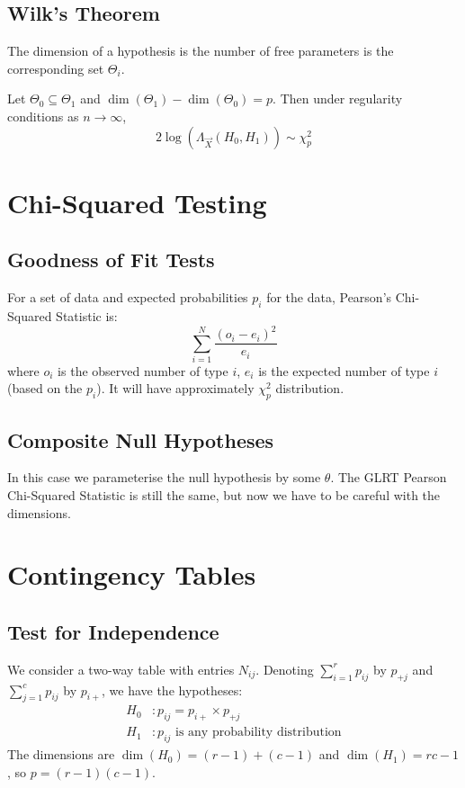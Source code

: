 \documentclass[../Main.tex]{subfiles}
\begin{document}
\subsection{Wilk's Theorem}
The dimension of a hypothesis is the number of free parameters is the corresponding set $\Theta_i$.
\begin{theorem}
    Let $\Theta_0 \subseteq \Theta_1$ and $\dim(\Theta_1) - \dim(\Theta_0) = p$. Then under regularity conditions as $n \to \infty$,
    \begin{equation*}
        2\log(\Lambda_{\vec{X}}(H_0, H_1)) \sim \chi_p^2
    \end{equation*}
    \label{thmWilk}
\end{theorem}
\section{Chi-Squared Testing}
\subsection{Goodness of Fit Tests}
For a set of data and expected probabilities $p_i$ for the data, Pearson's Chi-Squared Statistic is:
\begin{equation*}
    \sum_{i=1}^N \frac{(o_i - e_i)^2}{e_i}
\end{equation*}
where $o_i$ is the observed number of type $i$, $e_i$ is the expected number of type $i$ (based on the $p_i$). It will have approximately $\chi_p^2$ distribution.
\subsection{Composite Null Hypotheses}
In this case we parameterise the null hypothesis by some $\theta$. The GLRT Pearson Chi-Squared Statistic is still the same, but now we have to be careful with the dimensions.
\section{Contingency Tables}
\subsection{Test for Independence}
We consider a two-way table with entries $N_{ij}$. Denoting $\sum_{i=1}^{r} p_{ij}$ by $p_{+j}$ and $\sum_{j=1}^{c} p_{ij}$ by $p_{i+}$, we have the hypotheses:
\begin{align*}
    H_0&: p_{ij} = p_{i+} \times p_{+j} \\
    H_1&: p_{ij} \text{ is any probability distribution}
\end{align*}
The dimensions are $\dim(H_0) = (r - 1) + (c - 1)$ and $\dim(H_1) = rc-1$, so $p = (r-1)(c-1)$.
\end{document}
